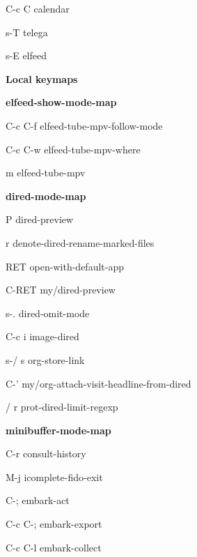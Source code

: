 \documentclass[10pt]{article}
\renewcommand\section[1]{\bigskip\par\textbf{\color{heading}\large#1}\smallskip}
\renewcommand\subsection[1]{\smallskip\par\textbf{\color{heading}#1}}
\begin{document}
\begin{multicols}{4}
\begin{keylist}
  \item[C-c C] calendar
  \item[s-T] telega
  \item[s-E] elfeed

  \end{keylist}

  \section{Local keymaps}
  \subsection{elfeed-show-mode-map}
  \begin{keylist}
  \item[C-c C-f] elfeed-tube-mpv-follow-mode
  \item[C-c C-w] elfeed-tube-mpv-where
  \item[m] elfeed-tube-mpv
  \end{keylist}
  \subsection{dired-mode-map}
  \begin{keylist}
  \item[P] dired-preview
  \item[r] denote-dired-rename-marked-files
  \item[RET] open-with-default-app
  \item[C-RET] my/dired-preview
  \item[s-.] dired-omit-mode
  \item[C-c i] image-dired
  \item[s-/ s] org-store-link
  \item[C-'] my/org-attach-visit-headline-from-dired
  \item[/ r] prot-dired-limit-regexp
  \end{keylist}
  \subsection{minibuffer-mode-map}
  \begin{keylist}
  \item[C-r] consult-history
  \item[M-j] icomplete-fido-exit

  \item[C-;] embark-act
  \item[C-c C-;] embark-export
  \item[C-c C-l] embark-collect
  \end{keylist}

\end{multicols}
\end{document}
